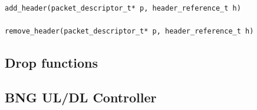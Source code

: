 \begin{lstlisting}[caption={Add header/ Remove header base functions}, label=msgpackunpack,]
add_header(packet_descriptor_t* p, header_reference_t h)

remove_header(packet_descriptor_t* p, header_reference_t h)
\end{lstlisting}


\subsection{Drop functions}


\subsection{BNG UL/DL Controller }





 